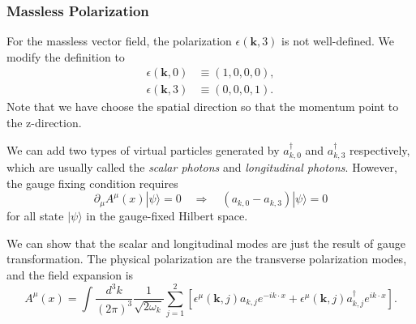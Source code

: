 \subsubsection{Massless Polarization}

For the massless vector field, the polarization $\epsilon(\bm k, 3)$ is not well-defined.
We modify the definition to
\begin{equation}
\begin{aligned}
	\epsilon(\bm k, 0) &\equiv (1,0,0,0), \\
	\epsilon(\bm k, 3) &\equiv (0,0,0,1).
\end{aligned}
\end{equation}
Note that we have choose the spatial direction so that the momentum point to the z-direction.

We can add two types of virtual particles generated by $a^\dagger_{k,0}$ and $a^\dagger_{k,3}$ respectively, which are usually called the \textit{scalar photons} and \textit{longitudinal photons}.
However, the gauge fixing condition requires
\begin{equation}
	\partial_\mu A^\mu(x)|\psi\rangle = 0 \quad \Longrightarrow \quad
	(a_{k,0}-a_{k,3})|\psi\rangle = 0
\end{equation}
for all state $|\psi\rangle$ in the gauge-fixed Hilbert space.

We can show that the scalar and longitudinal modes are just the result of gauge transformation.
The physical polarization are the transverse polarization modes, and the field expansion is
\begin{equation}
	A^\mu(x) = \int \frac{d^{3} k}{(2\pi)^{3}}\frac{1}{\sqrt{2\omega_k}}
	\sum_{j=1}^2 \left[\epsilon^\mu(\bm k, j) a_{k,j} e^{-ik\cdot x} + 
	\epsilon^{\mu}(\bm k, j) a^\dagger_{k,j} e^{ik\cdot x}\right].
\end{equation}


